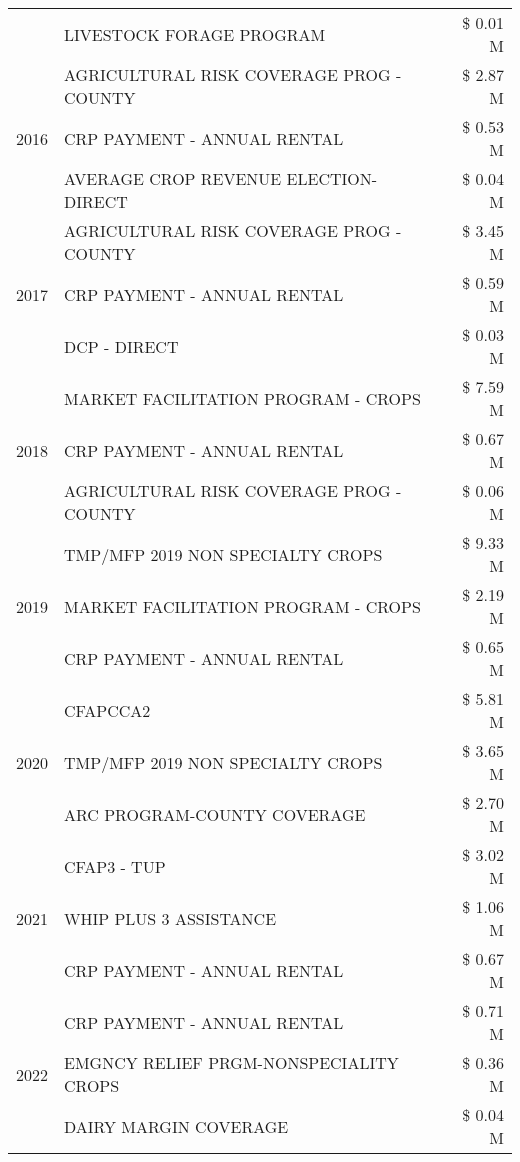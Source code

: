 \begin{tabular}{llr}
 & LIVESTOCK FORAGE PROGRAM & \$ 0.01 M \\
\cline{1-3}
\multirow[t]{3}{*}{2016} & AGRICULTURAL RISK COVERAGE PROG - COUNTY & \$ 2.87 M \\
 & CRP PAYMENT - ANNUAL RENTAL & \$ 0.53 M \\
 & AVERAGE CROP REVENUE ELECTION-DIRECT & \$ 0.04 M \\
\cline{1-3}
\multirow[t]{3}{*}{2017} & AGRICULTURAL RISK COVERAGE PROG - COUNTY & \$ 3.45 M \\
 & CRP PAYMENT - ANNUAL RENTAL & \$ 0.59 M \\
 & DCP - DIRECT & \$ 0.03 M \\
\cline{1-3}
\multirow[t]{3}{*}{2018} & MARKET FACILITATION PROGRAM - CROPS & \$ 7.59 M \\
 & CRP PAYMENT - ANNUAL RENTAL & \$ 0.67 M \\
 & AGRICULTURAL RISK COVERAGE PROG - COUNTY & \$ 0.06 M \\
\cline{1-3}
\multirow[t]{3}{*}{2019} & TMP/MFP 2019 NON SPECIALTY CROPS & \$ 9.33 M \\
 & MARKET FACILITATION PROGRAM - CROPS & \$ 2.19 M \\
 & CRP PAYMENT - ANNUAL RENTAL & \$ 0.65 M \\
\cline{1-3}
\multirow[t]{3}{*}{2020} & CFAPCCA2 & \$ 5.81 M \\
 & TMP/MFP 2019 NON SPECIALTY CROPS & \$ 3.65 M \\
 & ARC PROGRAM-COUNTY COVERAGE & \$ 2.70 M \\
\cline{1-3}
\multirow[t]{3}{*}{2021} & CFAP3 - TUP & \$ 3.02 M \\
 & WHIP PLUS 3 ASSISTANCE & \$ 1.06 M \\
 & CRP PAYMENT - ANNUAL RENTAL & \$ 0.67 M \\
\cline{1-3}
\multirow[t]{3}{*}{2022} & CRP PAYMENT - ANNUAL RENTAL & \$ 0.71 M \\
 & EMGNCY RELIEF PRGM-NONSPECIALITY CROPS & \$ 0.36 M \\
 & DAIRY MARGIN COVERAGE & \$ 0.04 M \\
\cline{1-3}
\bottomrule
\end{tabular}
